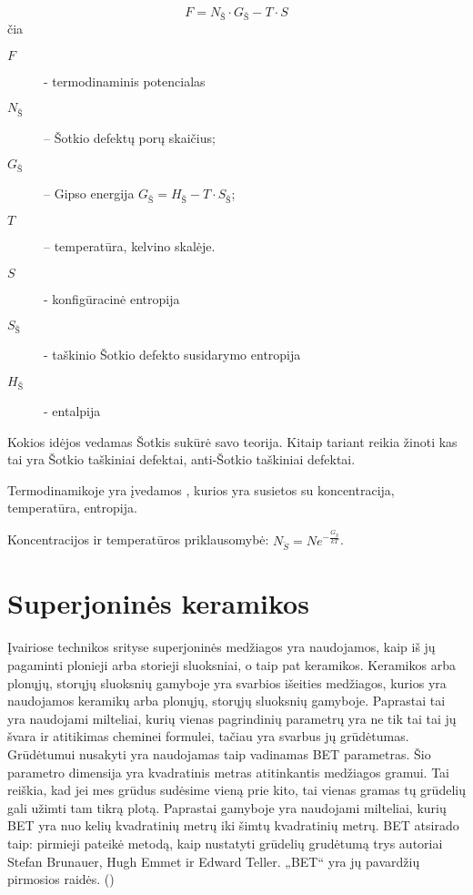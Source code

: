 \begin{equation*}
  F = N_Š \cdot G_Š - T \cdot S
\end{equation*}
čia
\begin{description}
  \item[$F$] - termodinaminis potencialas
  \item[$N_Š$] – Šotkio defektų porų skaičius;
  \item[$G_Š$] – Gipso energija $G_Š = H_Š - T \cdot S_Š$;
  \item[$T$] – temperatūra, kelvino skalėje.
  \item[$S$] - konfigūracinė entropija
  \item[$S_Š$] - taškinio Šotkio defekto susidarymo entropija
  \item[$H_Š$] - entalpija
\end{description}

 
\begin{remember}
  \item Kokios idėjos vedamas Šotkis sukūrė savo teorija. Kitaip tariant
    reikia žinoti kas tai yra Šotkio taškiniai defektai, anti-Šotkio
    taškiniai defektai.
  \item Termodinamikoje yra įvedamos , kurios yra susietos
    su koncentracija, temperatūra, entropija.
  \item Koncentracijos ir temperatūros priklausomybė:
    $N_{\check{S}} = N e^{-\frac{G_{\check{S}}}{kT}}$.
\end{remember}

\section{Superjoninės keramikos}

Įvairiose technikos srityse superjoninės medžiagos yra naudojamos,
kaip iš jų pagaminti plonieji arba storieji sluoksniai, o taip
pat keramikos. Keramikos arba plonųjų, storųjų sluoksnių gamyboje
yra svarbios išeities medžiagos, kurios yra naudojamos keramikų
arba plonųjų, storųjų sluoksnių gamyboje. Paprastai tai yra naudojami
milteliai, kurių vienas pagrindinių parametrų yra ne tik tai tai
jų švara ir atitikimas cheminei formulei, tačiau yra svarbus
jų grūdėtumas. Grūdėtumui nusakyti yra naudojamas taip vadinamas
BET parametras. Šio parametro dimensija yra kvadratinis metras
atitinkantis medžiagos gramui. Tai reiškia, kad jei mes grūdus
sudėsime vieną prie kito, tai vienas gramas tų grūdelių gali
užimti tam tikrą plotą. Paprastai gamyboje yra naudojami milteliai,
kurių BET yra nuo kelių kvadratinių metrų iki šimtų kvadratinių
metrų. BET atsirado taip: pirmieji pateikė metodą, kaip nustatyti
grūdelių grudėtumą trys autoriai Stefan Brunauer, Hugh Emmet ir
Edward Teller. „BET“ yra jų pavardžių pirmosios raidės. ()


